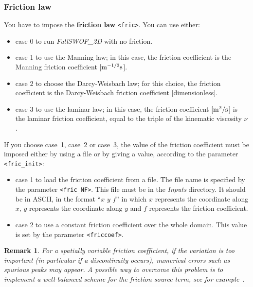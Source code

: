 \documentclass[a4paper, 11pt]{article}
\newcommand{\FullSWOF}{\emph{FullSWOF\_2D}}
\newtheorem{rmk}{Remark}
\begin{document}
\subsubsection{Friction law}
You have to impose the \textbf{friction law} \texttt{<fric>}. You can use either:
\begin{itemize}
\item case 0 to run \FullSWOF{} with no friction.
\item case 1 to use the Manning law; in this case, the friction coefficient is the Manning friction coefficient [$\rm m^{-1/3}s$]. 
\item case 2 to choose the Darcy-Weisbach law; for this choice, the friction coefficient is the Darcy-Weisbach friction coefficient [dimensionless].
\item case 3 to use the laminar law; in this case, the friction coefficient [$\rm m^{2}/s$] is the laminar friction coefficient,
equal to the triple of the kinematic viscosity $\nu$.
\end{itemize}
If you choose case~1, case~2 or case~3, the value of the friction coefficient must be imposed either by using a file or by giving a value, according to the parameter \texttt{<fric\_init>}:
\begin{itemize}
\item case 1 to load the friction coefficient from a file. The file name is specified by the parameter \texttt{<fric\_NF>}. This file must be in the \textit{Inputs} directory. It should be in ASCII, in the format ``$x$ $y$ $f$'' in which $x$ represents the coordinate along $x$, $y$ represents the coordinate along $y$ and $f$ represents the friction coefficient.
\item case 2 to use a constant friction coefficient over the whole domain. This value is set by the parameter \texttt{<friccoef>}.
\end{itemize}
\begin{rmk}
For a spatially variable friction coefficient, if the variation is too important (in particular if a discontinuity occurs), 
numerical errors such as spurious peaks may appear. 
A possible way to overcome this problem is to implement a well-balanced scheme for the friction source term, see for example~\cite{Bouchut04}. 
\end{rmk}
\end{document}
